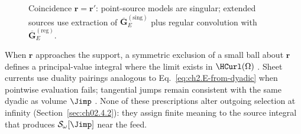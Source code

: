 \begin{figure}[t]
\centering
{}
\caption{Coincidence $ \mathbf{r}=\mathbf{r}' $: point-source models are singular; extended sources use extraction of $\overline{\mathbf{G}}_{E}^{\mathrm{(sing)}}$ plus regular convolution with $\overline{\mathbf{G}}_{E}^{\mathrm{(reg)}}$.}
\label{fig:ch2.singular-regularization-split}
\end{figure}

When $\mathbf{r}$ approaches the support, a symmetric exclusion of a small ball about $\mathbf{r}$ defines a principal-value integral where the limit exists in $\HCurl(\Omega)$ \cite{jackson1999}. Sheet currents use duality pairings analogous to Eq.~\eqref{eq:ch2.E-from-dyadic} when pointwise evaluation fails; tangential jumps remain consistent with the same dyadic as volume $\Jimp$ \cite{stratton1941}. None of these prescriptions alter outgoing selection at infinity (Section~\ref{sec:ch02.4.2}): they assign finite meaning to the source integral that produces $\mathcal{S}_\omega[\Jimp]$ near the feed.
